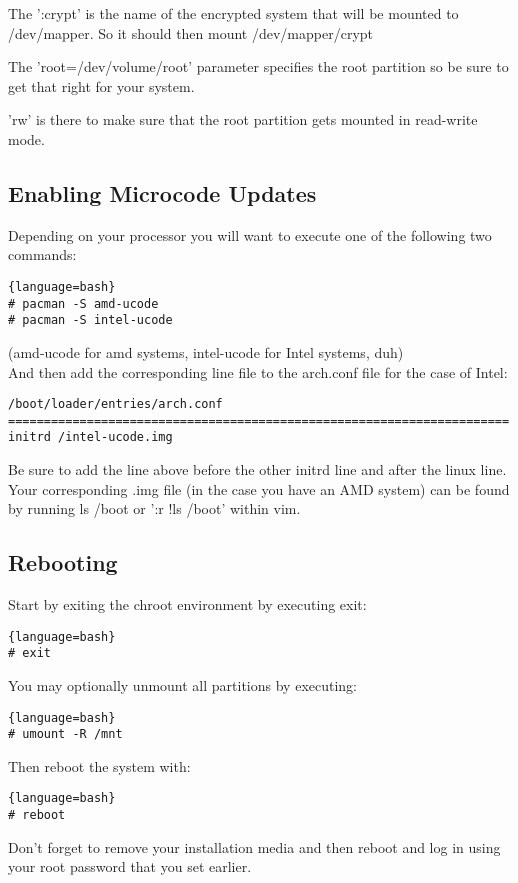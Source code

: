 The ':crypt' is the name of the encrypted system that will be mounted to /dev/mapper. So it should then mount /dev/mapper/crypt

The 'root=/dev/volume/root' parameter specifies the root partition so be sure to get that right for your system.

'rw' is there to make sure that the root partition gets mounted in read-write mode.

\subsection{Enabling Microcode Updates}
Depending on your processor you will want to execute one of the following two commands:
\begin{lstlisting}{language=bash}
# pacman -S amd-ucode
# pacman -S intel-ucode
\end{lstlisting}
(amd-ucode for amd systems, intel-ucode for Intel systems, duh)\\
And then add the corresponding line file to the arch.conf file for the case of Intel:
\begin{verbatim}
/boot/loader/entries/arch.conf
======================================================================
initrd /intel-ucode.img
\end{verbatim}
Be sure to add the line above before the other initrd line and after the linux line.
Your corresponding .img file (in the case you have an AMD system) can be found by running ls /boot or ':r !ls /boot' within vim.

\subsection{Rebooting}
Start by exiting the chroot environment by executing exit:
\begin{lstlisting}{language=bash}
# exit
\end{lstlisting}
You may optionally unmount all partitions by executing:
\begin{lstlisting}{language=bash}
# umount -R /mnt
\end{lstlisting}
Then reboot the system with:
\begin{lstlisting}{language=bash}
# reboot
\end{lstlisting}
Don't forget to remove your installation media and then reboot and log in using your root password that you set earlier.
